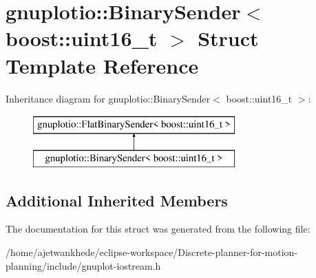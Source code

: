 \hypertarget{structgnuplotio_1_1BinarySender_3_01boost_1_1uint16__t_01_4}{}\section{gnuplotio\+:\+:Binary\+Sender$<$ boost\+:\+:uint16\+\_\+t $>$ Struct Template Reference}
\label{structgnuplotio_1_1BinarySender_3_01boost_1_1uint16__t_01_4}
Inheritance diagram for gnuplotio\+:\+:Binary\+Sender$<$ boost\+:\+:uint16\+\_\+t $>$\+:\begin{figure}[H]
\begin{center}
\leavevmode
\includegraphics[height=2.000000cm]{structgnuplotio_1_1BinarySender_3_01boost_1_1uint16__t_01_4}
\end{center}
\end{figure}
\subsection*{Additional Inherited Members}


The documentation for this struct was generated from the following file\+:\begin{DoxyCompactItemize}
\item 
/home/ajetwankhede/eclipse-\/workspace/\+Discrete-\/planner-\/for-\/motion-\/planning/include/gnuplot-\/iostream.\+h\end{DoxyCompactItemize}
